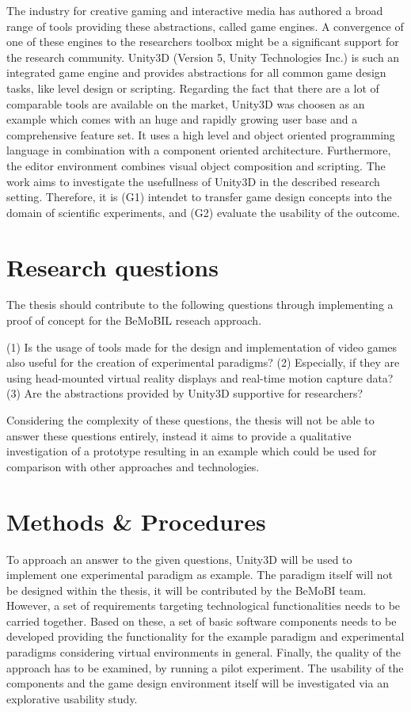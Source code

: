 \documentclass[bibtex,apacite]{apa6}
\begin{document}
The industry for creative gaming and interactive media has authored a broad range of tools providing these abstractions, called game engines. A convergence of one of these engines to the researchers toolbox might be a significant support for the research community. Unity3D (Version 5, Unity Technologies Inc.) is such an integrated game engine and provides abstractions for all common game design tasks, like level design or scripting. Regarding the fact that there are a lot of comparable tools are available on the market, Unity3D was choosen as an example which comes with an huge and rapidly growing user base and a comprehensive feature set. It uses a high level and object oriented programming language in combination with a component oriented architecture. Furthermore, the editor environment combines visual object composition and scripting. The work aims to investigate the usefullness of Unity3D in the described research setting. Therefore, it is (G1) intendet to transfer game design concepts into the domain of scientific experiments, and (G2) evaluate the usability of the outcome.

\section*{Research questions}
The thesis should contribute to the following questions through implementing a proof of concept for the BeMoBIL reseach approach.

(1) Is the usage of tools made for the design and implementation of video games also useful for the creation of experimental paradigms? 
(2) Especially, if they are using head-mounted virtual reality displays and real-time motion capture data?
(3) Are the abstractions provided by Unity3D supportive for researchers? 

Considering the complexity of these questions, the thesis will not be able to answer these questions entirely, instead it aims to provide a qualitative investigation of a prototype resulting in an example which could be used for comparison with other approaches and technologies.

\section*{Methods \& Procedures}
To approach an answer to the given questions, Unity3D will be used to implement one experimental paradigm as example. The paradigm itself will not be designed within the thesis, it will be contributed by the BeMoBI team. However, a set of requirements targeting technological functionalities needs to be carried together. Based on these, a set of basic software components needs to be developed providing the functionality for the example paradigm and experimental paradigms considering virtual environments in general. 
Finally, the quality of the approach has to be examined, by running a pilot experiment. The usability of the components and the game design environment itself will be investigated via an explorative usability study. 
\end{document}
